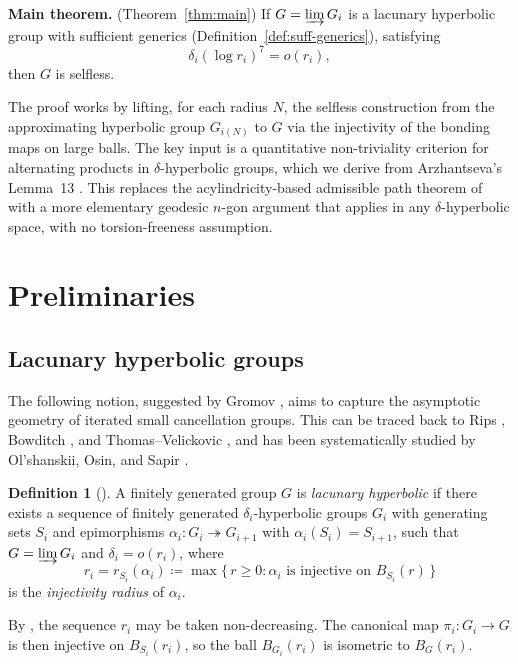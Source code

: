 \documentclass[12pt]{amsart}
\theoremstyle{plain}
\theoremstyle{definition}
\newtheorem{definition}[theorem]{Definition}
\begin{document}
\noindent\textbf{Main theorem.} (Theorem~\ref{thm:main}) If $G = \varinjlim G_i$ is a lacunary hyperbolic group
with sufficient generics (Definition~\ref{def:suff-generics}), satisfying
\[
  \delta_i(\log r_i)^{7} = o(r_i), \tag{$**$}
\]
then $G$ is selfless.

\medskip

The proof works by lifting, for each radius $N$, the selfless construction
from the approximating hyperbolic group $G_{i(N)}$ to $G$ via the
injectivity of the bonding maps on large balls.
The key input is a quantitative non-triviality criterion for alternating products
in $\delta$-hyperbolic groups, which we derive from Arzhantseva's
Lemma~13 \cite{Arz01}.
This replaces the acylindricity-based admissible path theorem of \cite{AGKE}
with a more elementary geodesic $n$-gon argument that applies in any
$\delta$-hyperbolic space, with no torsion-freeness assumption.

\section{Preliminaries}\label{sec:prelim}

\subsection{Lacunary hyperbolic groups}

The following notion, suggested by Gromov \cite{GrRWRG}, aims to capture the
asymptotic geometry of iterated small cancellation groups.
This can be traced back to Rips \cite{Rips}, Bowditch \cite{Bowditch}, and Thomas--Velickovic
\cite{ThomasVelickovic}, and has been systematically studied by
Ol'shanskii, Osin, and Sapir \cite{OOS}.

\begin{definition}[{\cite[Theorem~1.1]{OOS}}]
A finitely generated group $G$ is \emph{lacunary hyperbolic} if there exists
a sequence of finitely generated $\delta_i$-hyperbolic groups $G_i$ with
generating sets $S_i$ and epimorphisms $\alpha_i\colon G_i \twoheadrightarrow G_{i+1}$
with $\alpha_i(S_i) = S_{i+1}$, such that $G = \varinjlim G_i$ and
$\delta_i = o(r_i)$, where
\[
  r_i = r_{S_i}(\alpha_i) \coloneqq
  \max\{\,r \geq 0 : \alpha_i \text{ is injective on } B_{S_i}(r)\,\}
\]
is the \emph{injectivity radius} of $\alpha_i$.
\end{definition}

By \cite[Remark~3.4]{OOS}, the sequence $r_i$ may be taken non-decreasing.
The canonical map $\pi_i \colon G_i \to G$ is then injective on $B_{S_i}(r_i)$,
so the ball $B_{G_{i}}(r_i)$ is isometric to $B_{G}(r_i)$.
\end{document}
